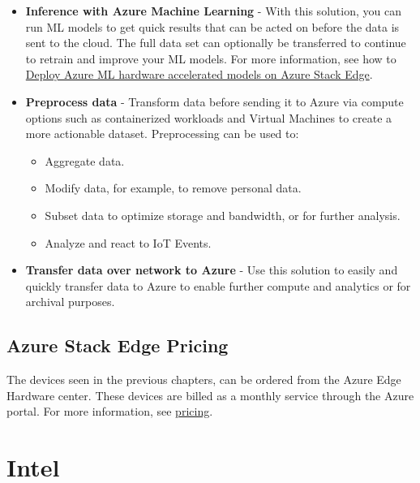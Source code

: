 \documentclass[a4paper]{article}
\begin{document}
    \begin{itemize}
        \item \textbf{Inference with Azure Machine Learning} - With this solution, you can run ML models to get quick results that can be acted on before the data is sent to the cloud. The full data set can optionally be transferred to continue to retrain and improve your ML models. For more information, see how to \href{https://learn.microsoft.com/en-us/azure/machine-learning/how-to-deploy-fpga-web-service#deploy-to-a-local-edge-server}{Deploy Azure ML hardware accelerated models on Azure Stack Edge}.

        \item \textbf{Preprocess data} - Transform data before sending it to Azure via compute options such as containerized workloads and Virtual Machines to create a more actionable dataset. Preprocessing can be used to:
        \begin{itemize}
            \item Aggregate data.
            \item Modify data, for example, to remove personal data.
            \item Subset data to optimize storage and bandwidth, or for further analysis.
            \item Analyze and react to IoT Events.
        \end{itemize}

        \item \textbf{Transfer data over network to Azure} - Use this solution to easily and quickly transfer data to Azure to enable further compute and analytics or for archival purposes.
    \end{itemize}

    \newpage

    \subsection{Azure Stack Edge Pricing}\label{subsection: azure stack edge pricing}

    The devices seen in the previous chapters, can be ordered from the Azure Edge Hardware center. These devices are billed as a monthly service through the Azure portal. For more information, see \href{https://azure.microsoft.com/en-gb/pricing/details/azure-stack/edge/#pricing}{pricing}.

    \newpage

    \section{Intel}\label{section: Intel}

    
\end{document}
